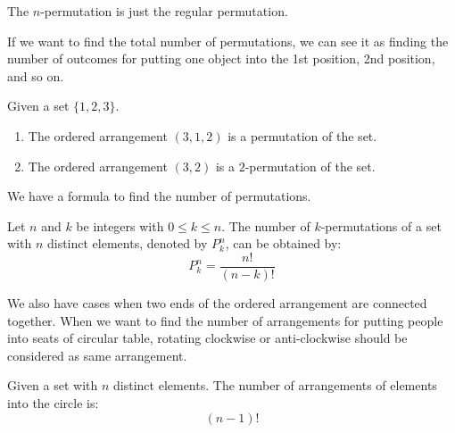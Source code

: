 \documentclass{huhtakm-template-book}
\begin{document}
\begin{rem}
	The $n$-permutation is just the regular permutation.
\end{rem}
\begin{rem}
	If we want to find the total number of permutations, we can see it as finding the number of outcomes for putting one object into the 1st position, 2nd position, and so on.
\end{rem}
\begin{eg}
	Given a set $\{1,2,3\}$.
	\begin{enumerate}
		\item The ordered arrangement $(3,1,2)$ is a permutation of the set.
		\item The ordered arrangement $(3,2)$ is a $2$-permutation of the set.
	\end{enumerate}
\end{eg}

\newpage
We have a formula to find the number of permutations.
\begin{thm}
	Let $n$ and $k$ be integers with $0\leq k\leq n$. The number of $k$-permutations of a set with $n$ distinct elements, denoted by $P_{k}^{n}$, can be obtained by:
	\begin{equation*}
		P_{k}^{n}=\frac{n!}{(n-k)!}
	\end{equation*}
\end{thm}
We also have cases when two ends of the ordered arrangement are connected together. When we want to find the number of arrangements for putting people into seats of circular table, rotating clockwise or anti-clockwise should be considered as same arrangement.
\begin{thm}
	Given a set with $n$ distinct elements. The number of arrangements of elements into the circle is:
	\begin{equation*}
		(n-1)!
	\end{equation*}
\end{thm}
\end{document}
